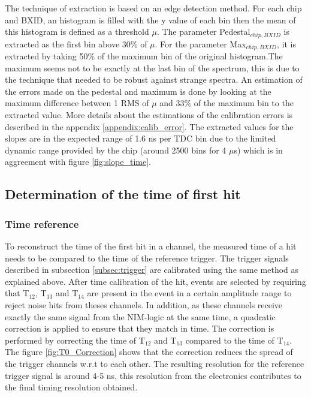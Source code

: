 \documentclass[twoside,a4paper,11pt]{article}
\begin{document}
The technique of extraction is based on an edge detection method. For each chip and BXID, an histogram is filled with the y value of each bin then the mean of this histogram is defined as a threshold $\mu$. The parameter Pedestal$_{chip, BXID}$ is extracted as the first bin above 30\% of $\mu$. For the parameter Max$_{chip, BXID}$, it is extracted by taking 50\% of the maximum bin of the original histogram.The maximum seems not to be exactly at the last bin of the spectrum, this is due to the technique that needed to be robust against strange spectra. An estimation of the errors made on the pedestal and maximum is done by looking at the maximum difference between 1 RMS of $\mu$ and 33\% of the maximum bin to the extracted value. More details about the estimations of the calibration errors is described in the appendix \ref{appendix:calib_error}. The extracted values for the slopes are in the expected range of 1.6 ns per TDC bin due to the limited dynamic range provided by the chip (around 2500 bins for 4 $\mu$s) which is in aggreement with figure \ref{fig:slope_time}.

\subsection{Determination of the time of first hit}

\subsubsection{Time reference}
\label{subsection:time_ref}
To reconstruct the time of the first hit in a channel, the measured time of a hit needs to be compared to the time of the reference trigger. The trigger signals described in subsection \ref{subsec:trigger} are calibrated using the same method as explained above. After time calibration of the hit, events are selected by requiring that T$_{12}$, T$_{13}$ and T$_{14}$ are present in the event in a certain amplitude range to reject noise hits from theses channels. In addition, as these channels receive exactly the same signal from the NIM-logic at the same time, a quadratic correction is applied to ensure that they match in time. The correction is performed by correcting the time of T$_{12}$ and T$_{13}$ compared to the time of T$_{14}$. The figure \ref{fig:T0_Correction} shows that the correction reduces the spread of the trigger channels w.r.t to each other. The resulting resolution for the reference trigger signal is around 4-5 ns, this resolution from the electronics contributes to the final timing resolution obtained.
\end{document}
